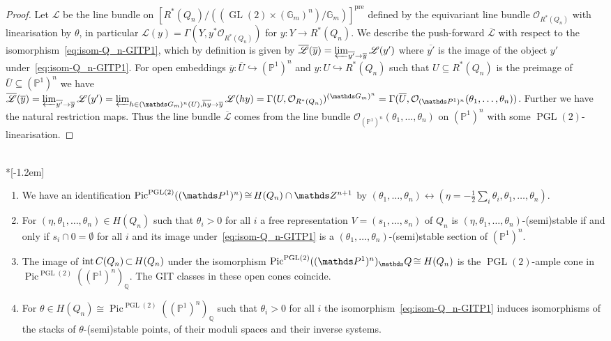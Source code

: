 \documentclass[ALCO,ThmDefs,Unicode,epreuves]{cedram}
\def\Z{\mathds Z}
\def\Q{\mathds Q}
\def\G{\mathds G}
\def\P{\mathds P}
\def\O{\mathcal O}
\DeclareMathOperator{\GL}{GL}
\DeclareMathOperator{\PGL}{PGL}
\DeclareMathOperator{\interior}{int}
\DeclareMathOperator{\Pic}{Pic}
\newcommand*{\Mk}{\mkern -2mu}
\begin{document}
\begin{proof}
Let $\mathscr L$ be the line bundle on 
$[R^*(Q_n)/((\GL(2)\times(\G_m)^n)/\G_m)]^\text{pre}$ defined by the 
equivariant line bundle $\O_{R^*(Q_n)}$ with linearisation by $\theta$, in 
particular $\mathscr L(y)=\Gamma(Y,y^*\O_{R^*(Q_n)})$ for $y\colon Y\to R^*(Q_n)$. 
We describe the push-forward $\overline{\mathscr L}$ with respect to the isomorphism~\eqref{eq:isom-Q_n-GITP1}, 
which by definition is given by 
$\overline{\mathscr L}(\overline{y})
=\varprojlim_{\overline{y'}\to\overline{y}}\mathscr L(y')$ where $\overline{y'}$ is the 
image of the object $y'$ under~\eqref{eq:isom-Q_n-GITP1}.
For open embeddings $\overline{y}\colon\overline{U}\hookrightarrow(\P^1)^n$ and 
$y\colon U\hookrightarrow R^*(Q_n)$ such that $U\subseteq R^*(Q_n)$ is the preimage of
$\overline{U}\subseteq(\P^1)^n$ we have
$\overline{\mathscr L}(\overline{y})
=\varprojlim_{\overline{y'}\to\overline{y}}\mathscr L(y')
=\varprojlim_{h\in(\G_m)^n(U),\overline{hy}\to\overline{y}}\mathscr L(hy)
=\Gamma(U,\O_{R^*(Q_n)})^{(\G_m)^n}
=\Gamma(\overline{U},\O_{(\P^1)^n}(\theta_1,\ldots,\theta_n))$.
Further we have the natural restriction maps. Thus the line bundle 
$\overline{\mathscr L}$ comes from the line bundle 
$\O_{(\P^1)^n}(\theta_1,\ldots,\theta_n)$ on $(\P^1)^n$ with some $\PGL(2)$-linearisation.
\end{proof}

\begin{coro}\ \\*[-1.2em]\label{cor:reprQn-P1n-GIT}

\begin{enumerate}[label=(\alph*)]
\item\label{coro2.10_a}
We have an identification
$\Pic^{\PGL(2)}((\P^1)^n)\Mk \cong \Mk H(Q_n)\cap\Z^{n+1}$ by 
$(\theta_1,\ldots,\theta_n)\leftrightarrow(\eta=-\frac{1}{2}\sum_i\theta_i,\theta_1,
\ldots,\theta_n)$.

\item\label{coro2.10_b}
For $(\eta,\theta_1,\ldots,\theta_n)\in H(Q_n)$ such that $\theta_i>0$ 
for all $i$ a free representation $V=(s_1,\ldots,s_n)$ of $Q_n$ is 
$(\eta,\theta_1,\ldots,\theta_n)$-(semi)stable if and only if 
$s_i\cap 0=\emptyset$ for all $i$ and its image under~\eqref{eq:isom-Q_n-GITP1} 
is a $(\theta_1,\ldots,\theta_n)$-(semi)stable 
section of $(\P^1)^n$.

\item\label{coro2.10_c}
The image of $\interior C(Q_n)\Mk \subset \Mk H(Q_n)$ under the isomorphism 
$\Pic^{\PGL(2)}((\P^1)^n)_\Q\Mk \cong H(Q_n)$ is the $\PGL(2)$-ample cone in 
$\Pic^{\PGL(2)}((\P^1)^n)_\Q$. The GIT classes in these open cones coincide.

\item\label{coro2.10_d}
For $\theta\in H(Q_n)\cong\Pic^{\PGL(2)}((\P^1)^n)_\Q$ such that 
$\theta_i>0$ for all $i$ the isomorphism~\eqref{eq:isom-Q_n-GITP1} induces 
isomorphisms of the stacks of $\theta$-(semi)stable points, of their moduli spaces 
and their inverse systems.
\end{enumerate}
\end{coro}
\end{document}
